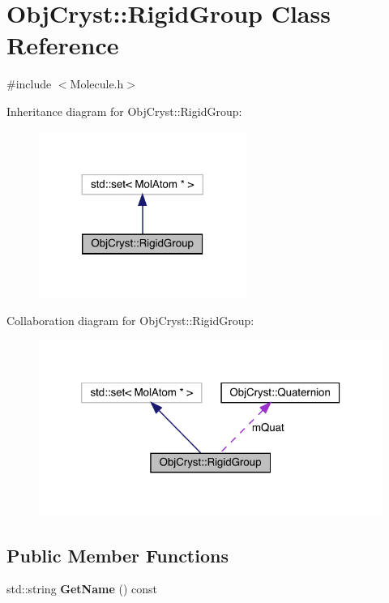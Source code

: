 \hypertarget{class_obj_cryst_1_1_rigid_group}{}\section{Obj\+Cryst\+::Rigid\+Group Class Reference}
\label{class_obj_cryst_1_1_rigid_group}


{\ttfamily \#include $<$Molecule.\+h$>$}



Inheritance diagram for Obj\+Cryst\+::Rigid\+Group\+:
\nopagebreak
\begin{figure}[H]
\begin{center}
\leavevmode
\includegraphics[width=192pt]{class_obj_cryst_1_1_rigid_group__inherit__graph}
\end{center}
\end{figure}


Collaboration diagram for Obj\+Cryst\+::Rigid\+Group\+:
\nopagebreak
\begin{figure}[H]
\begin{center}
\leavevmode
\includegraphics[width=320pt]{class_obj_cryst_1_1_rigid_group__coll__graph}
\end{center}
\end{figure}
\subsection*{Public Member Functions}
\begin{DoxyCompactItemize}
\item 
\mbox{\label{class_obj_cryst_1_1_rigid_group_ac96a957055b449c68b6fe75b33ef315f}} 
std\+::string {\bfseries Get\+Name} () const
\end{DoxyCompactItemize}
